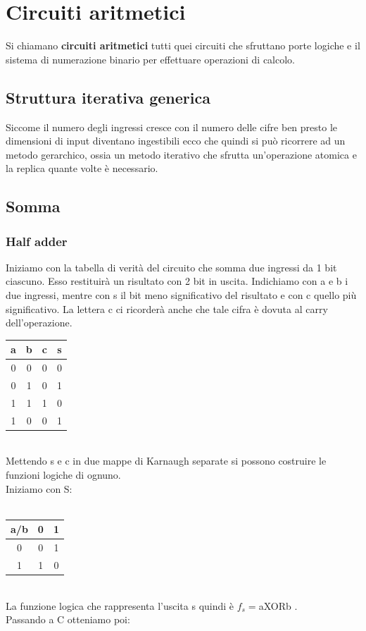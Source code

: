 \documentclass[a4paper]{book}
\begin{document}
\chapter{Circuiti aritmetici}

Si chiamano \textbf{circuiti aritmetici} tutti quei circuiti che sfruttano porte logiche e il sistema di numerazione binario per effettuare operazioni di calcolo.


\section{Struttura iterativa generica}

Siccome il numero degli ingressi cresce con il numero delle cifre ben presto le dimensioni di input diventano ingestibili ecco che quindi si può ricorrere ad un metodo gerarchico, ossia un metodo iterativo che sfrutta un'operazione atomica e la replica quante volte è necessario.


\section{Somma}

\subsection{Half adder}
Iniziamo con la tabella di verità del circuito che somma due ingressi da 1 bit ciascuno.
Esso restituirà un risultato con 2 bit in uscita.
Indichiamo con a e b i due ingressi, mentre con s il bit meno significativo del risultato e con c quello più significativo.
La lettera c ci ricorderà anche che tale cifra è dovuta al carry dell'operazione.
\\
\begin{tabular}{|c|c|c|c|}

\hline
a & b & c & s \\ \hline
0 & 0 & 0 & 0 \\ \hline
0 & 1 & 0 & 1 \\ \hline
1 & 1 & 1 & 0 \\ \hline
1 & 0 & 0 & 1 \\ 
\hline
\end{tabular}
\\Mettendo s e c in due mappe di Karnaugh separate si possono costruire le funzioni logiche di ognuno.\\
Iniziamo con S:\\\\
\begin{tabular}{|c|c|c|}
\hline
a/b & 0 & 1 \\ \hline
0   & 0 & \cellcolor{yellow}1 \\ \hline
1   & \cellcolor{yellow}1 & 0 \\ \hline
\end{tabular}\\
La funzione logica che rappresenta l'uscita s quindi è \(f_s=\)aXORb .\\
Passando a C otteniamo poi:
\end{document}
